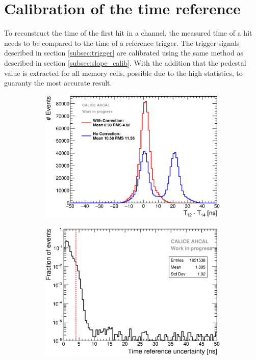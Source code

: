 \section{Calibration of the time reference}
\label{section:time_ref}

To reconstruct the time of the first hit in a channel, the measured time of a hit needs to be compared to the time of a reference trigger. The trigger signals described in section \ref{subsec:trigger} are calibrated using the same method as described in section \ref{subsec:slope_calib}. With the addition that the pedestal value is extracted for all memory cells, possible due to the high statistics, to guaranty the most accurate result.

\begin{figure}[htbp!]
	\begin{subfigure}[t]{0.49\textwidth}
		\centering
		\includegraphics[width=1\textwidth]{../Thesis_Plots/Timing/T0s/Plots/T0_Resolution_5.eps}
		\caption{}	\label{fig:T0_Correction}
	\end{subfigure}
	\hfill
	\begin{subfigure}[t]{0.49\textwidth}
		\centering
		\includegraphics[width=1\linewidth]{../Thesis_Plots/Timing/T0s/Plots/T0ReferenceError.eps}

\end{subfigure}
\end{figure}
